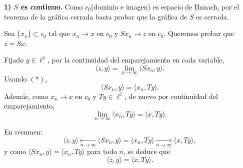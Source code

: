 \documentclass[12pt]{article}
\begin{document}
\begin{ejercicio}[2 puntos]
\begin{description}
            
            \textbf{1) $S$ es continuo.}
            Como $c_0$(dominio e imagen) es espacio de Banach, por el teorema de la gráfica cerrada
            basta probar que la gráfica de $S$ es cerrada.
            
            Sea $\{x_n\}\subset c_0$ tal que $x_n\to x$ en $c_0$ y $Sx_n\to z$ en $c_0$.
            Queremos probar que $z=Sx$.
            
            Fijado $y\in \ell^1$, por la continuidad del emparejamiento en cada variable,
            \begin{equation*}
            \langle z,y\rangle=\lim_{n\to\infty}\langle Sx_n,y\rangle.
            \end{equation*}
            Usando $(\ast)$,
            \begin{equation*}
            \langle Sx_n,y\rangle=\langle x_n,Ty\rangle.
            \end{equation*}
            Además, como $x_n\to x$ en $c_0$ y $Ty\in \ell^1$, de nuevo por continuidad del
            emparejamiento,
            \begin{equation*}
            \lim_{n\to\infty}\langle x_n,Ty\rangle=\langle x,Ty\rangle.
            \end{equation*}
            
            En resumen:
            \begin{equation*}
            \langle z,y\rangle
            \xleftarrow[n\to\infty]{}
            \langle Sx_n,y\rangle=
            \langle x_n,Ty\rangle
            \xrightarrow[n\to\infty]{}
            \langle x,Ty\rangle,
            \end{equation*}
            y como $\langle Sx_n,y\rangle=\langle x_n,Ty\rangle$ para todo $n$, se deduce que
            \begin{equation*}
            \langle z,y\rangle=\langle x,Ty\rangle.
            \end{equation*}
            

\end{description}
\end{ejercicio}
\end{document}
